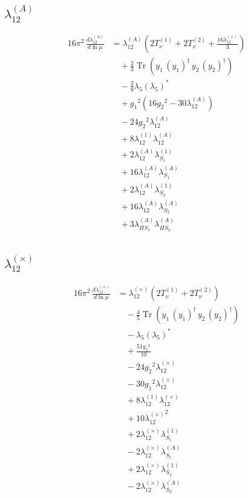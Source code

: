 \documentclass[10pt,a4paper]{article}
\begin{document}
\subsection*{$\lambda_{12}^{(A)}$}
\begin{align*}
16\pi^2\,\frac{d \lambda_{12}^{(A)}}{d\ln\mu} &={\lambda_{12}^{(A)}} \left(2 T_{\nu}^{(1)}+2 T_{\nu}^{(2)}+\frac{16 {\lambda_{12}^{(\times)}}}{3}\right) \\
&\quad +\frac{2}{3} \operatorname{Tr}\!\left({y_1}\,\left({y_1}\right)^{\dagger}\,{y_2}\,\left({y_2}\right)^{\dagger}\right) \\
&\quad -\frac{2}{9} {\lambda_5} \left({\lambda_5}\right)^{*} \\
&\quad +{g_1}^2 \left(16 {g_2}^2-30 {\lambda_{12}^{(A)}}\right) \\
&\quad -24 {g_2}^2 {\lambda_{12}^{(A)}} \\
&\quad +8 {\lambda_{12}^{(1)}} {\lambda_{12}^{(A)}} \\
&\quad +2 {\lambda_{12}^{(A)}} {\lambda_{S_1}^{(1)}} \\
&\quad +16 {\lambda_{12}^{(A)}} {\lambda_{S_1}^{(A)}} \\
&\quad +2 {\lambda_{12}^{(A)}} {\lambda_{S_2}^{(1)}} \\
&\quad +16 {\lambda_{12}^{(A)}} {\lambda_{S_2}^{(A)}} \\
&\quad +3 {\lambda_{HS_1}^{(A)}} {\lambda_{HS_2}^{(A)}} \\
\end{align*}
\subsection*{$\lambda_{12}^{(\times)}$}
\begin{align*}
16\pi^2\,\frac{d \lambda_{12}^{(\times)}}{d\ln\mu} &={\lambda_{12}^{(\times)}} (2 T_{\nu}^{(1)}+2 T_{\nu}^{(2)}) \\
&\quad -\frac{4}{5} \operatorname{Tr}\!\left({y_1}\,\left({y_1}\right)^{\dagger}\,{y_2}\,\left({y_2}\right)^{\dagger}\right) \\
&\quad -{\lambda_5} \left({\lambda_5}\right)^{*} \\
&\quad +\frac{51 {g_2}^4}{10} \\
&\quad -24 {g_2}^2 {\lambda_{12}^{(\times)}} \\
&\quad -30 {g_1}^2 {\lambda_{12}^{(\times)}} \\
&\quad +8 {\lambda_{12}^{(1)}} {\lambda_{12}^{(\times)}} \\
&\quad +10 {\lambda_{12}^{(\times)}}^2 \\
&\quad +2 {\lambda_{12}^{(\times)}} {\lambda_{S_1}^{(1)}} \\
&\quad -2 {\lambda_{12}^{(\times)}} {\lambda_{S_1}^{(A)}} \\
&\quad +2 {\lambda_{12}^{(\times)}} {\lambda_{S_2}^{(1)}} \\
&\quad -2 {\lambda_{12}^{(\times)}} {\lambda_{S_2}^{(A)}} \\
\end{align*}
\end{document}
